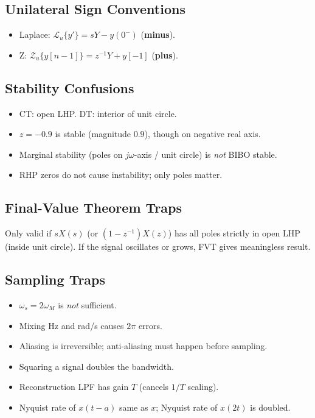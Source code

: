 \documentclass[11pt]{article}
\begin{document}
\subsection{Unilateral Sign Conventions}
\begin{itemize}[leftmargin=*]
  \item Laplace: $\mathcal{L}_u\{y'\} = sY - y(0^-)$ (\textbf{minus}).
  \item Z: $\mathcal{Z}_u\{y[n-1]\} = z^{-1}Y + y[-1]$ (\textbf{plus}).
\end{itemize}

\subsection{Stability Confusions}
\begin{itemize}[leftmargin=*]
  \item CT: open LHP. DT: interior of unit circle.
  \item $z=-0.9$ is stable (magnitude $0.9$), though on negative real axis.
  \item Marginal stability (poles on $j\omega$-axis / unit circle) is \emph{not} BIBO stable.
  \item RHP zeros do not cause instability; only poles matter.
\end{itemize}

\subsection{Final-Value Theorem Traps}
Only valid if $sX(s)$ (or $(1-z^{-1})X(z)$) has all poles strictly in open LHP (inside unit circle). If the signal oscillates or grows, FVT gives meaningless result.

\subsection{Sampling Traps}
\begin{itemize}[leftmargin=*]
  \item $\omega_s = 2\omega_M$ is \emph{not} sufficient.
  \item Mixing Hz and rad/s causes $2\pi$ errors.
  \item Aliasing is irreversible; anti-aliasing must happen before sampling.
  \item Squaring a signal doubles the bandwidth.
  \item Reconstruction LPF has gain $T$ (cancels $1/T$ scaling).
  \item Nyquist rate of $x(t-a)$ same as $x$; Nyquist rate of $x(2t)$ is doubled.
\end{itemize}
\end{document}
